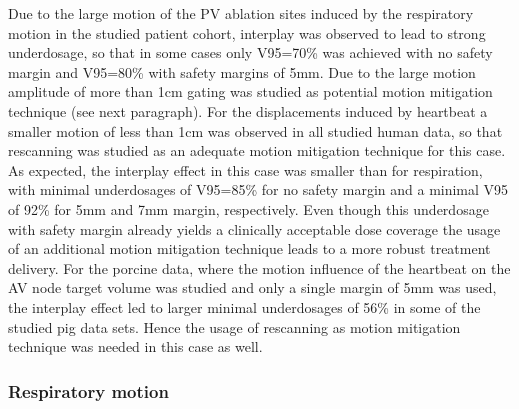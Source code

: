 Due to the large motion of the PV ablation sites induced by the respiratory motion in the studied patient cohort, interplay was observed to 
lead to strong underdosage, so that in some cases only V95=70\% was achieved with no safety margin and V95=80\% with safety margins of 
5mm. Due to the large motion amplitude of more than 1cm gating was studied as potential motion mitigation technique (see next paragraph). 
For the displacements induced by heartbeat a smaller motion of less than 1cm was observed in all studied human data, so that rescanning was studied 
as an adequate motion mitigation technique for this case. As expected, the interplay effect in this case was smaller than for respiration, 
with minimal underdosages of V95=85\% for no safety margin and a minimal V95 of 92\% for 5mm and 7mm margin, respectively. 
Even though this underdosage with safety margin already yields a clinically acceptable dose coverage the usage of an additional motion 
mitigation technique leads to a more robust treatment delivery. For the porcine data, where the motion influence of the heartbeat on the AV 
node target volume 
was studied and only a single margin of 5mm was used, the interplay effect led to larger minimal underdosages of 56\% in some of the studied 
pig data sets. Hence the usage of rescanning as motion mitigation technique was needed in this case as well. 


\subsubsection{Respiratory motion}
\label{diss:resp:mmt}

